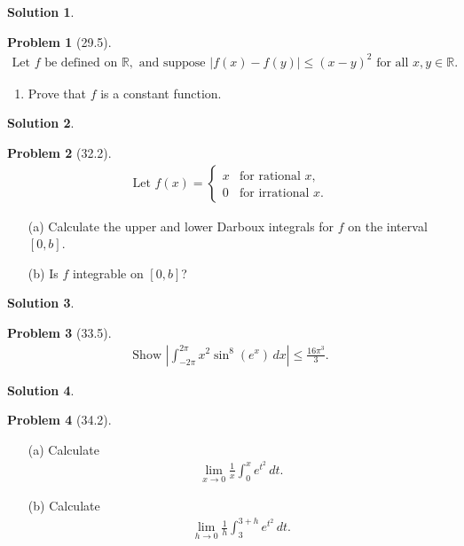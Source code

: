 \documentclass[12pt]{article}
\theoremstyle{definition} %
\newtheorem{solution}{Solution}
\newtheorem{problem}{Problem}
\theoremstyle{plain} %
\begin{document}
\begin{solution}
    
\end{solution}
\begin{problem}[29.5]
    \begin{align}
        \text{Let } f \text{ be defined on } \mathbb{R}, \text{ and suppose } |f(x) - f(y)| \leq (x - y)^2 \text{ for all } x, y \in \mathbb{R}.
    \end{align}
    \begin{enumerate}
        \item Prove that $ f $ is a constant function.
    \end{enumerate}
\end{problem}
\begin{solution}
    
\end{solution}
\begin{problem}[32.2]
    \begin{align}
        \text{Let } f(x) = 
        \begin{cases} 
            x & \text{for rational } x, \\
            0 & \text{for irrational } x.
        \end{cases}
    \end{align}
    \begin{enumerate}
        \item[(a)] Calculate the upper and lower Darboux integrals for $ f $ on the interval $[0, b]$.
        \item[(b)] Is $ f $ integrable on $[0, b]$?
    \end{enumerate}
\end{problem}
\begin{solution}
    
\end{solution}
\begin{problem}[33.5]
    \begin{align}
        \text{Show } \left| \int_{-2\pi}^{2\pi} x^2 \sin^8(e^x) \, dx \right| \leq \frac{16\pi^3}{3}.
    \end{align}
\end{problem}
\begin{solution}
    
\end{solution}
\begin{problem}[34.2]
    \begin{enumerate}
        \item[(a)] Calculate 
        \begin{align}
            \lim_{x \to 0} \frac{1}{x} \int_{0}^{x} e^{t^2} \, dt.
        \end{align}
        \item[(b)] Calculate 
        \begin{align}
            \lim_{h \to 0} \frac{1}{h} \int_{3}^{3+h} e^{t^2} \, dt.
        \end{align}
    \end{enumerate}
\end{problem}
\end{document}

